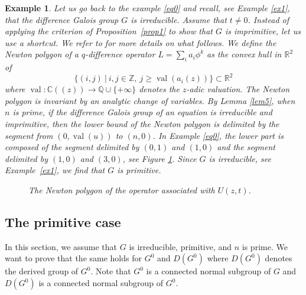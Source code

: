\documentclass[a4paper,11pt]{amsart}
\renewcommand{\geq}{\geqslant}
\newcommand{\val}{\operatorname{val}}
\newtheorem{ex}[thm]{Example}
\def\Z{\mathbb{Z}}
\def\C{\mathbb{C}}
\def\R{\mathbb{R}}
\def\Q{\mathbb{Q}}
\begin{document}
\begin{ex}\label{ex2}
Let us go back to the example \eqref{eq0} and recall, see Example \ref{ex1}, that the difference Galois group $G$ is irreducible. Assume that $t\neq 0$. Instead of applying the criterion of Proposition~\ref{prop1} to show that $G$ is imprimitive,  let us use a shortcut.  We refer to \cite[Section 2.2]{ramis2013local} for more details on what follows. 
We define the Newton polygon of a $q$-difference operator 
$L=\sum_i a_{i} \phi^k$
as the convex hull in $\R^2$ of  
$$
\{(i,j) \ \vert \ i,j \in \Z, \ j \geq \val(a_{i}(z))\} \subset \R^{2}
$$
where $\val : \C((z)) \rightarrow \Q \cup \{+\infty\}$ denotes the $z$-adic valuation.  The Newton polygon  is invariant by an analytic change of variables. 
By Lemma \ref{lem5}, when $n$ is prime, if the difference Galois group of an equation is irreducible and imprimitive,  then the lower bound of the Newton polygon is delimited by the segment from $(0,\val (u))$ to $(n,0)$.  In Example \eqref{eq0}, the lower part is composed of the segment delimited by $(0,1)$ and $(1,0)$ and the segment delimited by $(1,0)$ and $(3,0)$, see Figure \ref{fig1}.  Since $G$ is irreducible,  see Example~\ref{ex1}, we find that $G$ is primitive. 

\begin{figure}[!h]
\begin{center}
\caption{The Newton polygon of the operator associated with $U(z,t)$.}\label{fig1}
\end{center}
\end{figure}

\end{ex}

\subsection{The primitive case} 
In this section, we assume that $G$ is irreducible, primitive, and $n$ is prime. We want to prove that the same holds for $G^0$ and $D(G^0)$ where $D(G^0)$ denotes the derived group of $G^0$. Note that $G^0$ is a connected normal subgroup of $G$ and $D(G^0)$ is a connected normal subgroup of $G^0$. 
\end{document}

